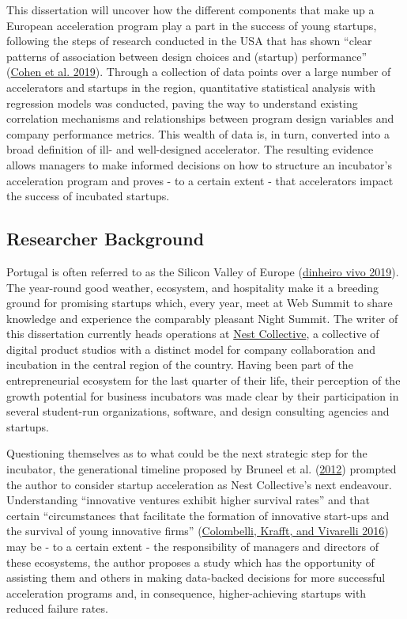 \documentclass[
  12pt,
]{article}
\begin{document}
This dissertation will uncover how the different components that make up a European acceleration program play a part in the success of young startups, following the steps of research conducted in the USA that has shown ``clear patterns of association between design choices and (startup) performance'' (\protect\hyperlink{ref-cohen_design_2019}{Cohen et al. 2019}). Through a collection of data points over a large number of accelerators and startups in the region, quantitative statistical analysis with regression models was conducted, paving the way to understand existing correlation mechanisms and relationships between program design variables and company performance metrics. This wealth of data is, in turn, converted into a broad definition of ill- and well-designed accelerator. The resulting evidence allows managers to make informed decisions on how to structure an incubator's acceleration program and proves - to a certain extent - that accelerators impact the success of incubated startups.

\hypertarget{researcher-background}{%
\subsection{Researcher Background}\label{researcher-background}}

Portugal is often referred to as the Silicon Valley of Europe (\protect\hyperlink{ref-dinheiro_vivo_2019}{dinheiro vivo 2019}). The year-round good weather, ecosystem, and hospitality make it a breeding ground for promising startups which, every year, meet at Web Summit to share knowledge and experience the comparably pleasant Night Summit. The writer of this dissertation currently heads operations at \href{https://nestcollective.co}{Nest Collective}, a collective of digital product studios with a distinct model for company collaboration and incubation in the central region of the country. Having been part of the entrepreneurial ecosystem for the last quarter of their life, their perception of the growth potential for business incubators was made clear by their participation in several student-run organizations, software, and design consulting agencies and startups.

Questioning themselves as to what could be the next strategic step for the incubator, the generational timeline proposed by Bruneel et al. (\protect\hyperlink{ref-bruneel_evolution_2012}{2012}) prompted the author to consider startup acceleration as Nest Collective's next endeavour. Understanding ``innovative ventures exhibit higher survival rates'' and that certain ``circumstances that facilitate the formation of innovative start-ups and the survival of young innovative firms'' (\protect\hyperlink{ref-colombelli_be_2016}{Colombelli, Krafft, and Vivarelli 2016}) may be - to a certain extent - the responsibility of managers and directors of these ecosystems, the author proposes a study which has the opportunity of assisting them and others in making data-backed decisions for more successful acceleration programs and, in consequence, higher-achieving startups with reduced failure rates.
\end{document}
